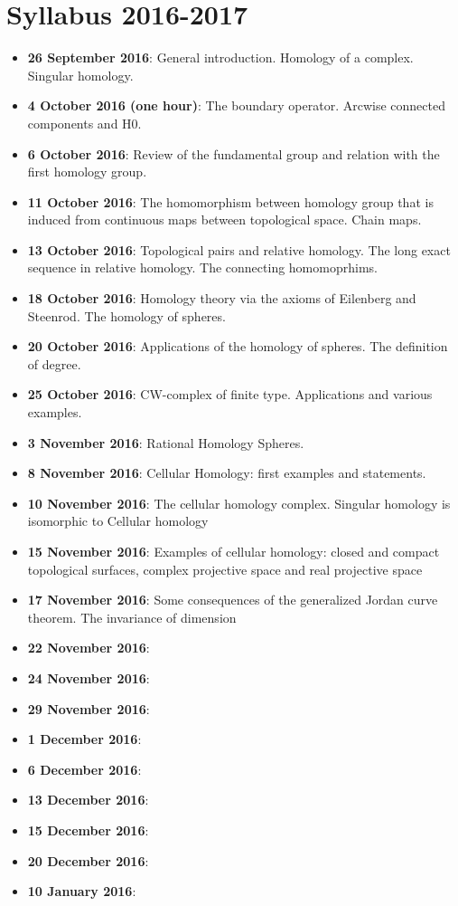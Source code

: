 \documentclass[10pt, twoside=false, x11names]{scrbook}
\begin{document}
\chapter*{Syllabus 2016-2017}
\begin{itemize}
\item \textbf{26 September 2016}: General introduction. Homology of a complex. Singular homology.
\item \textbf{4 October 2016 (one hour)}: The boundary operator. Arcwise connected components and H0.
\item \textbf{6 October 2016}: Review of the fundamental group and relation with the first homology group.
\item \textbf{11 October 2016}: The homomorphism between homology group that is induced from continuous maps between topological space. Chain maps.
\item \textbf{13 October 2016}: Topological pairs and relative homology. The long exact sequence in relative homology. The connecting homomoprhims.
\item \textbf{18 October 2016}: Homology theory via the axioms of Eilenberg and Steenrod. The homology of spheres.
\item \textbf{20 October 2016}: Applications of the homology of spheres. The definition of degree.
\item \textbf{25 October 2016}: CW-complex of finite type. Applications and various examples.
\item \textbf{3 November 2016}: Rational Homology Spheres.
\item \textbf{8 November 2016}: Cellular Homology: first examples and statements.
\item \textbf{10 November 2016}: The cellular homology complex. Singular homology is isomorphic to Cellular homology
\item \textbf{15 November 2016}: Examples of cellular homology: closed and compact topological surfaces, complex projective space and real projective space
\item \textbf{17 November 2016}: Some consequences of the generalized Jordan curve theorem. The invariance of dimension
\item \textbf{22 November 2016}:
\item \textbf{24 November 2016}:
\item \textbf{29 November 2016}:
\item \textbf{1 December 2016}:
\item \textbf{6 December 2016}:
\item \textbf{13 December 2016}:
\item \textbf{15 December 2016}:
\item \textbf{20 December 2016}:
\item \textbf{10 January 2016}:
\end{itemize}
\end{document}
